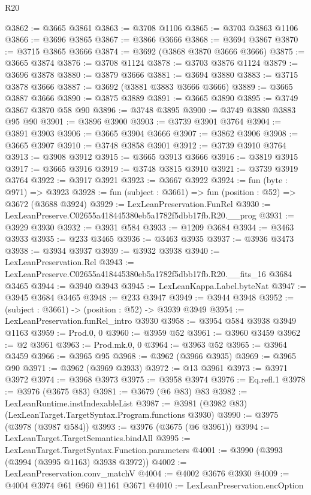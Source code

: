 \begin{lexlean}{R20}
\begin{coremodule}
@3862 := @3665 @3861
@3863 := @3708 @1106
@3865 := @3703 @3863 @1106
@3866 := @3696 @3865
@3867 := @3866 @3666
@3868 := @3694 @3867
@3870 := @3715 @3865 @3666
@3874 := @3692 (@3868 @3870 @3666 @3666)
@3875 := @3665 @3874
@3876 := @3708 @1124
@3878 := @3703 @3876 @1124
@3879 := @3696 @3878
@3880 := @3879 @3666
@3881 := @3694 @3880
@3883 := @3715 @3878 @3666
@3887 := @3692 (@3881 @3883 @3666 @3666)
@3889 := @3665 @3887 @3666
@3890 := @3875 @3889
@3891 := @3665 @3890
@3895 := @3749 @3867 @3870 @58 @90
@3896 := @3748 @3895
@3900 := @3749 @3880 @3883 @95 @90
@3901 := @3896 @3900
@3903 := @3739 @3901 @3764
@3904 := @3891 @3903
@3906 := @3665 @3904 @3666
@3907 := @3862 @3906
@3908 := @3665 @3907
@3910 := @3748 @3858 @3901
@3912 := @3739 @3910 @3764
@3913 := @3908 @3912
@3915 := @3665 @3913 @3666
@3916 := @3819 @3915
@3917 := @3665 @3916
@3919 := @3748 @3815 @3910
@3921 := @3739 @3919 @3764
@3922 := @3917 @3921
@3923 := @3667 @3922
@3924 := fun (byte : @971) => @3923
@3928 := fun (subject : @3661) => fun (position : @52) => @3672 (@3688 @3924)
@3929 := LexLeanPreservation.FunRel
@3930 := LexLeanPreserve.C02655a418445380eb5a1782f5dbb17fb.R20.__prog
@3931 := @3929 @3930
@3932 := @3931 @584
@3933 := @1209 @3684
@3934 := @3463 @3933
@3935 := @233 @3465
@3936 := @3463 @3935
@3937 := @3936 @3473
@3938 := @3934 @3937
@3939 := @3932 @3938
@3940 := LexLeanPreservation.Rel
@3943 := LexLeanPreserve.C02655a418445380eb5a1782f5dbb17fb.R20.__fits_16 @3684 @3465
@3944 := @3940 @3943
@3945 := LexLeanKappa.Label.byteNat
@3947 := @3945 @3684 @3465
@3948 := @233 @3947
@3949 := @3944 @3948
@3952 := (subject : @3661) -> (position : @52) -> @3939 @3949
@3954 := LexLeanPreservation.funRel_intro @3930
@3958 := @3954 @584 @3938 @3949 @1163
@3959 := Prod.{0, 0}
@3960 := @3959 @52
@3961 := @3960 @3459
@3962 := @2 @3961
@3963 := Prod.mk.{0, 0}
@3964 := @3963 @52
@3965 := @3964 @3459
@3966 := @3965 @95
@3968 := @3962 (@3966 @3935)
@3969 := @3965 @90
@3971 := @3962 (@3969 @3933)
@3972 := @13 @3961
@3973 := @3971 @3972
@3974 := @3968 @3973
@3975 := @3958 @3974
@3976 := Eq.refl.{1}
@3978 := @3976 (@3675 @83)
@3981 := @3679 (@6 @83) @83
@3982 := LexLeanRuntime.instIndexableList
@3987 := @3981 (@3982 @83) (LexLeanTarget.TargetSyntax.Program.functions @3930)
@3990 := @3975 (@3978 (@3987 @584))
@3993 := @3976 (@3675 (@6 @3961))
@3994 := LexLeanTarget.TargetSemantics.bindAll
@3995 := LexLeanTarget.TargetSyntax.Function.parameters
@4001 := @3990 (@3993 (@3994 (@3995 @1163) @3938 @3972))
@4002 := LexLeanPreservation.conv_matchV
@4004 := @4002 @3676 @3930
@4009 := @4004 @3974 @61 @960 @1161 @3671
@4010 := LexLeanPreservation.encOption

\end{coremodule}
\end{lexlean}
